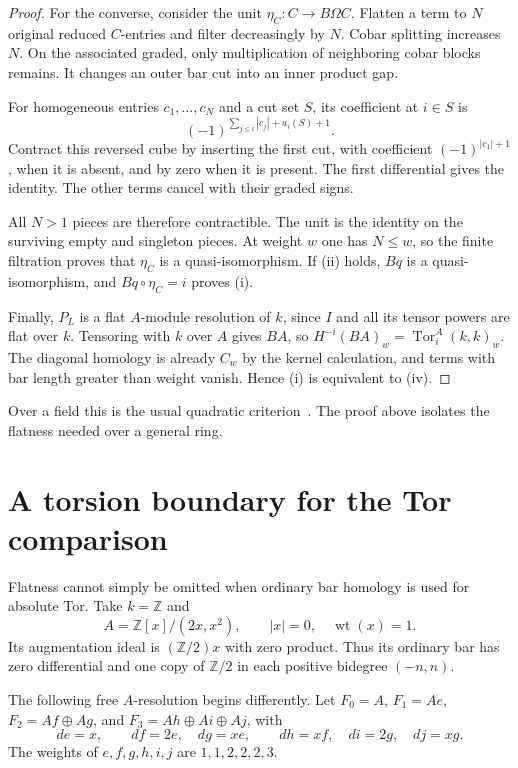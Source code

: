 \begin{proof}
For the converse, consider the unit $\eta_C:C\to B\Omega C$.
Flatten a term to $N$ original reduced $C$-entries and filter decreasingly by $N$.
Cobar splitting increases $N$.
On the associated graded, only multiplication of neighboring cobar blocks remains.
It changes an outer bar cut into an inner product gap.

For homogeneous entries $c_1,\ldots,c_N$ and a cut set $S$, its coefficient at $i\in S$ is
\[
 (-1)^{\sum_{j\leq i}|c_j|+u_i(S)+1}.
\]
Contract this reversed cube by inserting the first cut, with coefficient $(-1)^{|c_1|+1}$, when it is absent, and by zero when it is present.
The first differential gives the identity.
The other terms cancel with their graded signs.

All $N>1$ pieces are therefore contractible.
The unit is the identity on the surviving empty and singleton pieces.
At weight $w$ one has $N\leq w$, so the finite filtration proves that $\eta_C$ is a quasi-isomorphism.
If (ii) holds, $Bq$ is a quasi-isomorphism, and $Bq\circ\eta_C=i$ proves (i).

Finally, $P_L$ is a flat $A$-module resolution of $k$, since $I$ and all its tensor powers are flat over $k$.
Tensoring with $k$ over $A$ gives $BA$, so $H^{-i}(BA)_w=\operatorname{Tor}^A_i(k,k)_w$.
The diagonal homology is already $C_w$ by the kernel calculation, and terms with bar length greater than weight vanish.
Hence (i) is equivalent to (iv).
\end{proof}

Over a field this is the usual quadratic criterion~\cite[Theorem~3.4.6]{LV}.
The proof above isolates the flatness needed over a general ring.

\section{A torsion boundary for the Tor comparison}
Flatness cannot simply be omitted when ordinary bar homology is used for absolute Tor.
Take $k=\mathbb Z$ and
\[
 A=\mathbb Z[x]/(2x,x^2),\qquad |x|=0,\quad\operatorname{wt}(x)=1.
\]
Its augmentation ideal is $(\mathbb Z/2)x$ with zero product.
Thus its ordinary bar has zero differential and one copy of $\mathbb Z/2$ in each positive bidegree $(-n,n)$.

The following free $A$-resolution begins differently.
Let $F_0=A$, $F_1=Ae$, $F_2=Af\oplus Ag$, and $F_3=Ah\oplus Ai\oplus Aj$, with
\[
 de=x,\qquad df=2e,\quad dg=xe,
 \qquad dh=xf,\quad di=2g,\quad dj=xg.
\]
The weights of $e,f,g,h,i,j$ are $1,1,2,2,2,3$.

